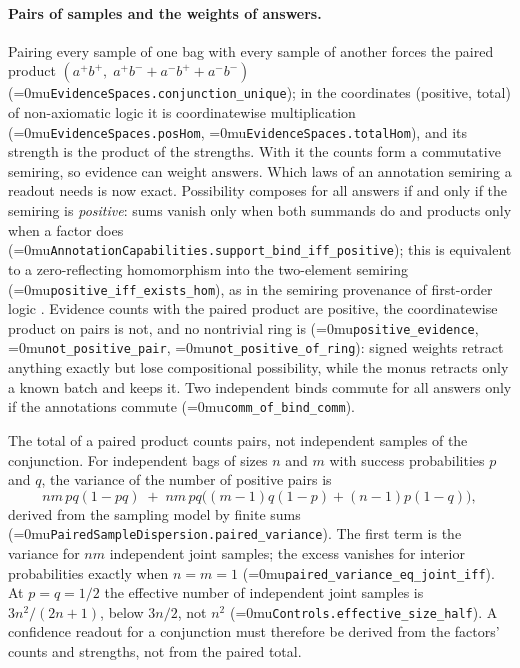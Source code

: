 \documentclass[11pt]{article}
\newcommand{\leanname}[1]{\textup{\Urlmuskip=0mu\relax\nolinkurl{#1}}}
\theoremstyle{definition}
\theoremstyle{remark}
\begin{document}
\paragraph{Pairs of samples and the weights of answers.}
Pairing every sample of one bag with every sample of another forces the
paired product $(a^+b^+,\;a^+b^-+a^-b^++a^-b^-)$
(\leanname{EvidenceSpaces.conjunction_unique}); in the coordinates (positive,
total) of non-axiomatic logic it is coordinatewise multiplication
(\leanname{EvidenceSpaces.posHom}, \leanname{EvidenceSpaces.totalHom}), and its
strength is the product of the strengths.  With it the counts form a
commutative semiring, so evidence can weight answers.  Which laws of an
annotation semiring a readout needs is now exact.  Possibility composes for
all answers if and only if the semiring is \emph{positive}: sums vanish only
when both summands do and products only when a factor does
(\leanname{AnnotationCapabilities.support_bind_iff_positive}); this is
equivalent to a zero-reflecting homomorphism into the two-element semiring
(\leanname{positive_iff_exists_hom}), as in the semiring provenance of
first-order logic \cite{GradelTannenProvenance}.  Evidence counts with the
paired product are positive, the coordinatewise product on pairs is not, and
no nontrivial ring is (\leanname{positive_evidence},
\leanname{not_positive_pair}, \leanname{not_positive_of_ring}): signed
weights retract anything exactly but lose compositional possibility, while
the monus retracts only a known batch and keeps it.  Two independent binds
commute for all answers only if the annotations commute
(\leanname{comm_of_bind_comm}).

The total of a paired product counts pairs, not independent samples of the
conjunction.  For independent bags of sizes $n$ and $m$ with success
probabilities $p$ and $q$, the variance of the number of positive pairs is
\[
  nm\,pq(1-pq)\;+\;nm\,pq\bigl((m-1)q(1-p)+(n-1)p(1-q)\bigr),
\]
derived from the sampling model by finite sums
(\leanname{PairedSampleDispersion.paired_variance}).  The first term is the
variance for $nm$ independent joint samples; the excess vanishes for interior
probabilities exactly when $n=m=1$
(\leanname{paired_variance_eq_joint_iff}).  At $p=q=1/2$ the effective number
of independent joint samples is $3n^2/(2n+1)$, below $3n/2$, not $n^2$
(\leanname{Controls.effective_size_half}).  A confidence readout for a
conjunction must therefore be derived from the factors' counts and strengths,
not from the paired total.
\end{document}
